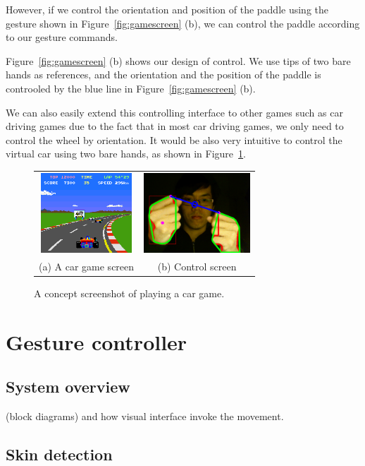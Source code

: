 \documentclass[10pt,twocolumn,letterpaper]{article}
\begin{document}
However, if we control the orientation and position of the paddle 
using the gesture shown in Figure~\ref{fig:gamescreen} (b), 
we can control the paddle according to our gesture commands.

Figure~\ref{fig:gamescreen} (b) shows our design of control. 
We use tips of two bare hands as references, and the orientation and 
the position of the paddle is controoled by the blue line in 
Figure~\ref{fig:gamescreen} (b).

We can also easily extend this controlling interface to other 
games such as car driving games due to the fact that in most 
car driving games, we only need to control the wheel by 
orientation. It would be also very intuitive to control 
the virtual car using two bare hands, as shown in Figure~\ref{fig:cargame}.
\begin{figure}[h]
\centering
\begin{tabular}{cc}
\includegraphics[height=3cm]{cargame.png} &
\includegraphics[height=3cm]{gesture0047.png} \\
(a) A car game screen &
(b) Control screen
\end{tabular}
\caption{A concept screenshot of playing a car game.}
\label{fig:cargame}
\end{figure}

\section{Gesture controller}
\subsection{System overview}
(block diagrams) and how visual interface invoke the movement.

\subsection{Skin detection}
\end{document}
